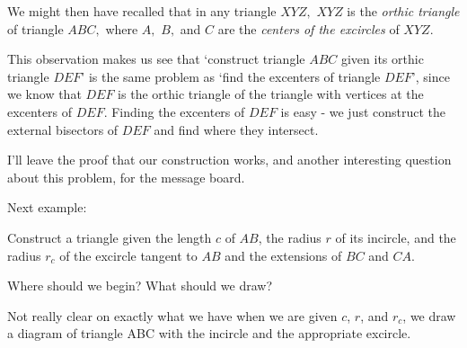


We might then have recalled that in any triangle $XYZ,$ $XYZ $ is the \emph{orthic triangle} of triangle $ABC,$ where $A,$ $B,$ and $C$ are the \emph{centers of the excircles} of $XYZ.$

This observation makes us see that `construct triangle $ABC$ given its orthic triangle $DEF$' is the same problem as `find the excenters of triangle $DEF$', since we know that $DEF$ is the orthic triangle of the triangle with vertices at the excenters of $DEF$. Finding the excenters of $DEF$ is easy - we just construct the external bisectors of $DEF$ and find where they intersect.

I'll leave the proof that our construction works, and another interesting question about this problem, for the message board.



\vspace{10pt}
Next example:

\begin{example}
    Construct a triangle given the length $c$ of $AB$, the radius $r$ of its incircle, and the radius $r_c$ of the excircle tangent to $AB$ and the extensions of $BC$ and $CA$.    
\end{example}

Where should we begin?  What should we draw?



Not really clear on exactly what we have when we are given $c$, $r$, and $r_c$, we draw a diagram of triangle ABC with the incircle and the appropriate excircle.


